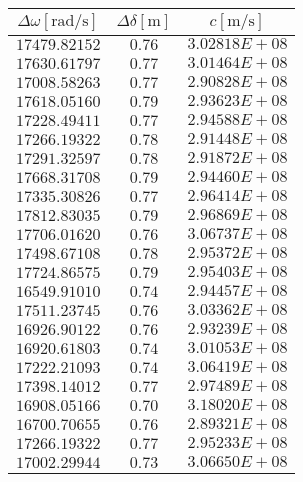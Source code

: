 \documentclass{article} %
\begin{document}
    \begin{table}
        \centering
        \begin{tabular}{||c|c|c||}
            \hline
            $\Delta \omega [\text{rad/s}]$ & $\Delta \delta [\text{m}]$ & $c [\text{m/s}]$ \\
            \hline\hline
            $17479.82152$ & $0.76$ & $3.02818E+08$ \\\hline
            $17630.61797$ & $0.77$ & $3.01464E+08$ \\\hline
            $17008.58263$ & $0.77$ & $2.90828E+08$ \\\hline
            $17618.05160$ & $0.79$ & $2.93623E+08$ \\\hline
            $17228.49411$ & $0.77$ & $2.94588E+08$ \\\hline
            $17266.19322$ & $0.78$ & $2.91448E+08$ \\\hline
            $17291.32597$ & $0.78$ & $2.91872E+08$ \\\hline
            $17668.31708$ & $0.79$ & $2.94460E+08$ \\\hline
            $17335.30826$ & $0.77$ & $2.96414E+08$ \\\hline
            $17812.83035$ & $0.79$ & $2.96869E+08$ \\\hline
            $17706.01620$ & $0.76$ & $3.06737E+08$ \\\hline
            $17498.67108$ & $0.78$ & $2.95372E+08$ \\\hline
            $17724.86575$ & $0.79$ & $2.95403E+08$ \\\hline
            $16549.91010$ & $0.74$ & $2.94457E+08$ \\\hline
            $17511.23745$ & $0.76$ & $3.03362E+08$ \\\hline
            $16926.90122$ & $0.76$ & $2.93239E+08$ \\\hline
            $16920.61803$ & $0.74$ & $3.01053E+08$ \\\hline
            $17222.21093$ & $0.74$ & $3.06419E+08$ \\\hline
            $17398.14012$ & $0.77$ & $2.97489E+08$ \\\hline
            $16908.05166$ & $0.70$ & $3.18020E+08$ \\\hline
            $16700.70655$ & $0.76$ & $2.89321E+08$ \\\hline
            $17266.19322$ & $0.77$ & $2.95233E+08$ \\\hline
            $17002.29944$ & $0.73$ & $3.06650E+08$ \\\hline

\end{tabular}
\end{table}
\end{document}
